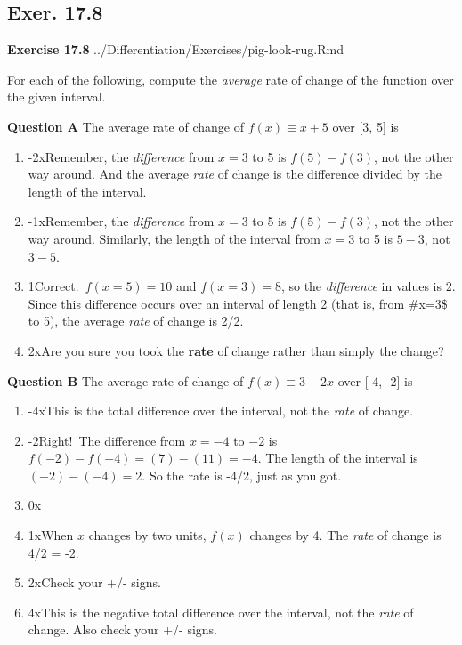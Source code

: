 \documentclass[
  letterpaper,
  DIV=11,
  numbers=noendperiod,
  oneside]{article}
\providecommand{\tightlist}{%
  \setlength{\itemsep}{0pt}\setlength{\parskip}{0pt}}\usepackage{longtable,booktabs,array}
\begin{document}
\begin{multicols}{2}
\hypertarget{exer.-17.8}{%
\section*{Exer. 17.8}\label{exer.-17.8}}

\textbf{Exercise 17.8} ../Differentiation/Exercises/pig-look-rug.Rmd

For each of the following, compute the \emph{average} rate of change of
the function over the given interval.

\textbf{Question A} The average rate of change of \(f(x) \equiv x + 5\)
over {[}3, 5{]} is

\begin{enumerate}
\def\labelenumi{\roman{enumi}.}
\tightlist
\item
  {-2{xRemember, the \emph{difference} from \(x=3\) to 5 is
  \(f(5) - f(3)\), not the other way around. And the average \emph{rate}
  of change is the difference divided by the length of the interval.}}\\
\item
  {-1{xRemember, the \emph{difference} from \(x=3\) to 5 is
  \(f(5) - f(3)\), not the other way around. Similarly, the length of
  the interval from \(x=3\) to 5 is \(5-3\), not \(3-5\).}}\\
\item
  {1{Correct.~\(f(x=5) = 10\) and \(f(x=3) = 8\), so the
  \emph{difference} in values is 2. Since this difference occurs over an
  interval of length 2 (that is, from \#x=3\$ to 5), the average
  \emph{rate} of change is 2/2.}}\\
\item
  {2{xAre you sure you took the \textbf{rate} of change rather than
  simply the change?}}
\end{enumerate}

\textbf{Question B} The average rate of change of
\(f(x) \equiv 3 - 2 x\) over {[}-4, -2{]} is

\begin{enumerate}
\def\labelenumi{\roman{enumi}.}
\tightlist
\item
  {-4{xThis is the total difference over the interval, not the
  \emph{rate} of change.}}\\
\item
  {-2{Right!~The difference from \(x=-4\) to \(-2\) is
  \(f(-2) - f(-4) = (7) - (11) = -4\). The length of the interval is
  \((-2) - (-4) = 2\). So the rate is -4/2, just as you got.}}\\
\item
  {0{x}}\\
\item
  {1{xWhen \(x\) changes by two units, \(f(x)\) changes by 4. The
  \emph{rate} of change is 4/2 = -2.}}\\
\item
  {2{xCheck your +/- signs.}}\\
\item
  {4{xThis is the negative total difference over the interval, not the
  \emph{rate} of change. Also check your +/- signs.}}
\end{enumerate}


\end{multicols}
\end{document}
